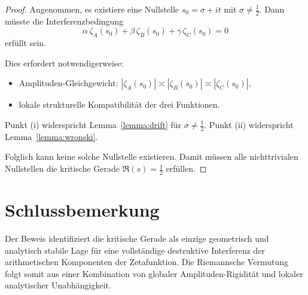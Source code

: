 \documentclass[11pt]{article}
\begin{document}
\begin{proof}
Angenommen, es existiere eine Nullstelle $s_0=\sigma+i t$ mit $\sigma\neq\tfrac12$.
Dann müsste die Interferenzbedingung
\[
\alpha\,\zeta_A(s_0)+\beta\,\zeta_B(s_0)+\gamma\,\zeta_C(s_0)=0
\]
erfüllt sein.

Dies erfordert notwendigerweise:
\begin{itemize}
\item[(i)] Amplituden-Gleichgewicht: $|\zeta_A(s_0)|\asymp|\zeta_B(s_0)|\asymp|\zeta_C(s_0)|$,
\item[(ii)] lokale strukturelle Kompatibilität der drei Funktionen.
\end{itemize}

Punkt (i) widerspricht Lemma~\ref{lemma:drift} für $\sigma\neq\tfrac12$.
Punkt (ii) widerspricht Lemma~\ref{lemma:wronski}.

Folglich kann keine solche Nullstelle existieren.
Damit müssen alle nichttrivialen Nullstellen die kritische Gerade $\Re(s)=\tfrac12$ erfüllen.
\end{proof}

\section{Schlussbemerkung}

Der Beweis identifiziert die kritische Gerade als einzige geometrisch und analytisch stabile Lage für eine vollständige destruktive Interferenz der arithmetischen Komponenten der Zetafunktion.
Die Riemannsche Vermutung folgt somit aus einer Kombination von globaler Amplituden-Rigidität und lokaler analytischer Unabhängigkeit.
\end{document}
